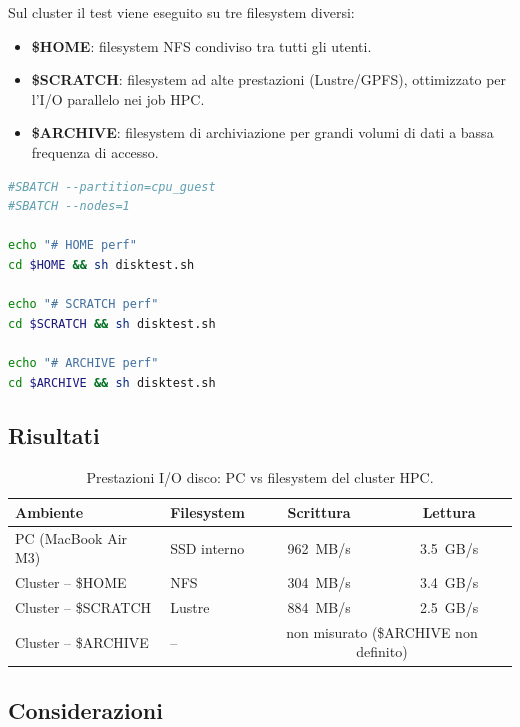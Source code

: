 \documentclass[a4paper,12pt]{article}
\begin{document}
Sul cluster il test viene eseguito su tre filesystem diversi:

\begin{itemize}
    \item \textbf{\$HOME}: filesystem NFS condiviso tra tutti gli utenti.
    \item \textbf{\$SCRATCH}: filesystem ad alte prestazioni (Lustre/GPFS), ottimizzato per l'I/O parallelo nei job HPC.
    \item \textbf{\$ARCHIVE}: filesystem di archiviazione per grandi volumi di dati a bassa frequenza di accesso.
\end{itemize}

\begin{lstlisting}[language=bash]
#SBATCH --partition=cpu_guest
#SBATCH --nodes=1

echo "# HOME perf"
cd $HOME && sh disktest.sh

echo "# SCRATCH perf"
cd $SCRATCH && sh disktest.sh

echo "# ARCHIVE perf"
cd $ARCHIVE && sh disktest.sh
\end{lstlisting}

\subsection{Risultati}

\begin{table}[H]
\centering
\begin{tabular}{llcc}
\toprule
\textbf{Ambiente} & \textbf{Filesystem} & \textbf{Scrittura} & \textbf{Lettura} \\
\midrule
PC (MacBook Air M3)  & SSD interno & 962~MB/s  & 3.5~GB/s \\
Cluster -- \$HOME    & NFS         & 304~MB/s  & 3.4~GB/s \\
Cluster -- \$SCRATCH & Lustre      & 884~MB/s  & 2.5~GB/s \\
Cluster -- \$ARCHIVE & --          & \multicolumn{2}{c}{non misurato (\$ARCHIVE non definito)} \\
\bottomrule
\end{tabular}
\caption{Prestazioni I/O disco: PC vs filesystem del cluster HPC.}
\end{table}

\subsection{Considerazioni}
\end{document}

